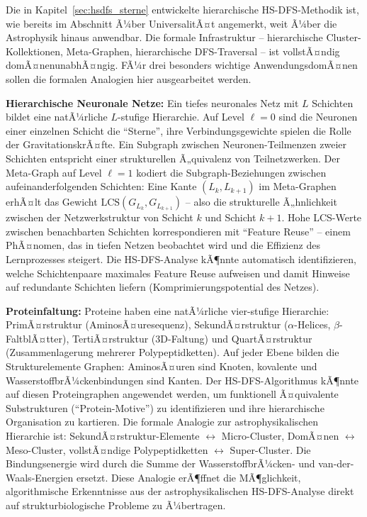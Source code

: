 ﻿\documentclass[a4paper,12pt]{report}
\theoremstyle{definition}
\begin{document}
Die in Kapitel~\ref{sec:hsdfs_sterne} entwickelte hierarchische HS-DFS-Methodik ist, wie bereits im Abschnitt Ã¼ber UniversalitÃ¤t angemerkt, weit Ã¼ber die Astrophysik hinaus anwendbar. Die formale Infrastruktur -- hierarchische Cluster-Kollektionen, Meta-Graphen, hierarchische DFS-Traversal -- ist vollstÃ¤ndig domÃ¤nenunabhÃ¤ngig. FÃ¼r drei besonders wichtige AnwendungsdomÃ¤nen sollen die formalen Analogien hier ausgearbeitet werden.

\textbf{Hierarchische Neuronale Netze:} Ein tiefes neuronales Netz mit $L$ Schichten bildet eine natÃ¼rliche $L$-stufige Hierarchie. Auf Level $\ell = 0$ sind die Neuronen einer einzelnen Schicht die ``Sterne'', ihre Verbindungsgewichte spielen die Rolle der GravitationskrÃ¤fte. Ein Subgraph zwischen Neuronen-Teilmenzen zweier Schichten entspricht einer strukturellen Ã„quivalenz von Teilnetzwerken. Der Meta-Graph auf Level $\ell = 1$ kodiert die Subgraph-Beziehungen zwischen aufeinanderfolgenden Schichten: Eine Kante $(L_k, L_{k+1})$ im Meta-Graphen erhÃ¤lt das Gewicht $\mathrm{LCS}(G_{L_k}, G_{L_{k+1}})$ -- also die strukturelle Ã„hnlichkeit zwischen der Netzwerkstruktur von Schicht $k$ und Schicht $k+1$. Hohe LCS-Werte zwischen benachbarten Schichten korrespondieren mit ``Feature Reuse'' -- einem PhÃ¤nomen, das in tiefen Netzen beobachtet wird und die Effizienz des Lernprozesses steigert. Die HS-DFS-Analyse kÃ¶nnte automatisch identifizieren, welche Schichtenpaare maximales Feature Reuse aufweisen und damit Hinweise auf redundante Schichten liefern (Komprimierungspotential des Netzes).

\textbf{Proteinfaltung:} Proteine haben eine natÃ¼rliche vier-stufige Hierarchie: PrimÃ¤rstruktur (AminosÃ¤uresequenz), SekundÃ¤rstruktur ($\alpha$-Helices, $\beta$-FaltblÃ¤tter), TertiÃ¤rstruktur (3D-Faltung) und QuartÃ¤rstruktur (Zusammenlagerung mehrerer Polypeptidketten). Auf jeder Ebene bilden die Strukturelemente Graphen: AminosÃ¤uren sind Knoten, kovalente und WasserstoffbrÃ¼ckenbindungen sind Kanten. Der HS-DFS-Algorithmus kÃ¶nnte auf diesen Proteingraphen angewendet werden, um funktionell Ã¤quivalente Substrukturen (``Protein-Motive'') zu identifizieren und ihre hierarchische Organisation zu kartieren. Die formale Analogie zur astrophysikalischen Hierarchie ist: SekundÃ¤rstruktur-Elemente $\leftrightarrow$ Micro-Cluster, DomÃ¤nen $\leftrightarrow$ Meso-Cluster, vollstÃ¤ndige Polypeptidketten $\leftrightarrow$ Super-Cluster. Die Bindungsenergie wird durch die Summe der WasserstoffbrÃ¼cken- und van-der-Waals-Energien ersetzt. Diese Analogie erÃ¶ffnet die MÃ¶glichkeit, algorithmische Erkenntnisse aus der astrophysikalischen HS-DFS-Analyse direkt auf strukturbiologische Probleme zu Ã¼bertragen.
\end{document}
